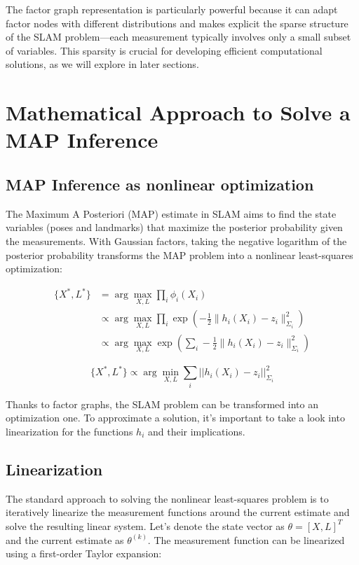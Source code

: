 \documentclass[journal]{IEEEtran}
\begin{document}
The factor graph representation is particularly powerful because it can adapt factor nodes with different distributions and makes explicit the sparse structure of the SLAM problem—each measurement typically involves only a small subset of variables. This sparsity is crucial for developing efficient computational solutions, as we will explore in later sections.

\section{Mathematical Approach to Solve a MAP Inference}

\subsection{MAP Inference as nonlinear optimization}

The Maximum A Posteriori (MAP) estimate in SLAM aims to find the state variables (poses and landmarks) that maximize the posterior probability given the measurements. With Gaussian factors, taking the negative logarithm of the posterior probability transforms the MAP problem into a nonlinear least-squares optimization:

\[
\begin{aligned}
    \{X^*, L^*\} &= \arg\max_{X, L} \prod_i \phi_i(X_i) \\
    &\propto \arg\max_{X, L} \prod_i \exp \left(- \frac{1}{2} \|h_i(X_i) - z_i\|^2_{\Sigma_i} \right) \\
    &\propto \arg\max_{X, L} \exp \left( \sum_i - \frac{1}{2} \|h_i(X_i) - z_i\|^2_{\Sigma_i} \right) 
\end{aligned}
\]

\begin{equation}
    \{X^*, L^*\} \propto \arg\min_{X,L} \sum_i ||h_i(X_i) - z_i||^2_{\Sigma_i}
\end{equation}

Thanks to factor graphs, the SLAM problem can be transformed into an optimization one. To approximate a solution, it's important to take a look into linearization for the functions $h_i$ and their implications.

\subsection{Linearization}

The standard approach to solving the nonlinear least-squares problem is to iteratively linearize the measurement functions around the current estimate and solve the resulting linear system. Let's denote the state vector as $\theta = [X, L]^T$ and the current estimate as $\theta^{(k)}$. The measurement function can be linearized using a first-order Taylor expansion:
\end{document}
